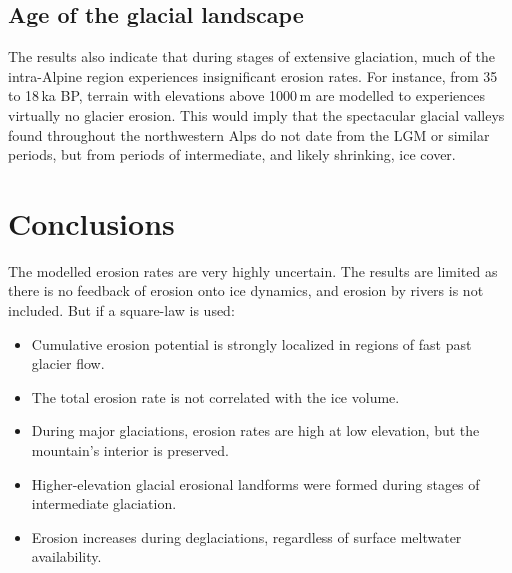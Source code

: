 \documentclass[utf8]{article}
\begin{document}
\subsection{Age of the glacial landscape}

    The results also indicate that during stages of extensive glaciation, much
    of the intra-Alpine region experiences insignificant erosion rates. For
    instance, from 35 to 18\,ka BP, terrain with elevations above 1000\,m are
    modelled to experiences virtually no glacier erosion. This would imply that
    the spectacular glacial valleys found throughout the northwestern Alps do
    not date from the LGM or similar periods, but from periods of intermediate,
    and likely shrinking, ice cover.


\section{Conclusions}

    The modelled erosion rates are very highly uncertain. The results are
    limited as there is no feedback of erosion onto ice dynamics, and
    erosion by rivers is not included. But if a square-law is used:
    \begin{itemize}
      \item Cumulative erosion potential is strongly localized in regions
        of fast past glacier flow.
      \item The total erosion rate is not correlated with the ice volume.
      \item During major glaciations, erosion rates are high at low elevation,
        but the mountain's interior is preserved.
      \item Higher-elevation glacial erosional landforms were formed during
        stages of intermediate glaciation.
      \item Erosion increases during deglaciations, regardless of surface
        meltwater availability.
    \end{itemize}

\end{document}
